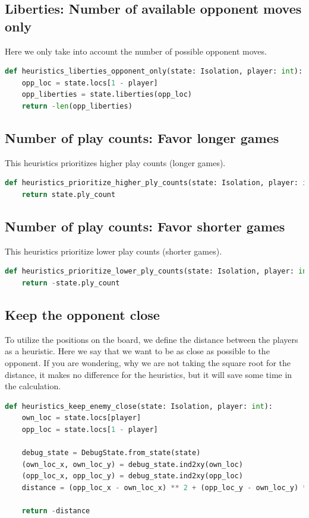 \documentclass[aps,prd,notitlepage,floatfix,superscriptaddress,groupedaddress,nofootinbib]{revtex4-1}
\begin{document}
\subsection*{Liberties: Number of available opponent moves only}
Here we only take into account the number of possible opponent moves.

\begin{lstlisting}[language=python]
def heuristics_liberties_opponent_only(state: Isolation, player: int):
    opp_loc = state.locs[1 - player]
    opp_liberties = state.liberties(opp_loc)
    return -len(opp_liberties)
\end{lstlisting}

\subsection*{Number of play counts: Favor longer games}
This heuristics prioritizes higher play counts (longer games).

\begin{lstlisting}[language=python]
def heuristics_prioritize_higher_ply_counts(state: Isolation, player: int):
    return state.ply_count
\end{lstlisting}

\subsection*{Number of play counts: Favor shorter games}
This heuristics prioritize lower play counts (shorter games).

\begin{lstlisting}[language=python]
def heuristics_prioritize_lower_ply_counts(state: Isolation, player: int):
    return -state.ply_count
\end{lstlisting}

\subsection*{Keep the opponent close}
To utilize the positions on the board, we define the distance between the players as a heuristic. Here we say that we want to be as close as possible to the opponent. If you are wondering, why we are not taking the square root for the distance, it makes no difference for the heuristics, but it will save some time in the calculation.

\begin{lstlisting}[language=python]
def heuristics_keep_enemy_close(state: Isolation, player: int):
    own_loc = state.locs[player]
    opp_loc = state.locs[1 - player]

    debug_state = DebugState.from_state(state)
    (own_loc_x, own_loc_y) = debug_state.ind2xy(own_loc)
    (opp_loc_x, opp_loc_y) = debug_state.ind2xy(opp_loc)
    distance = (opp_loc_x - own_loc_x) ** 2 + (opp_loc_y - own_loc_y) ** 2

    return -distance
\end{lstlisting}
\end{document}
